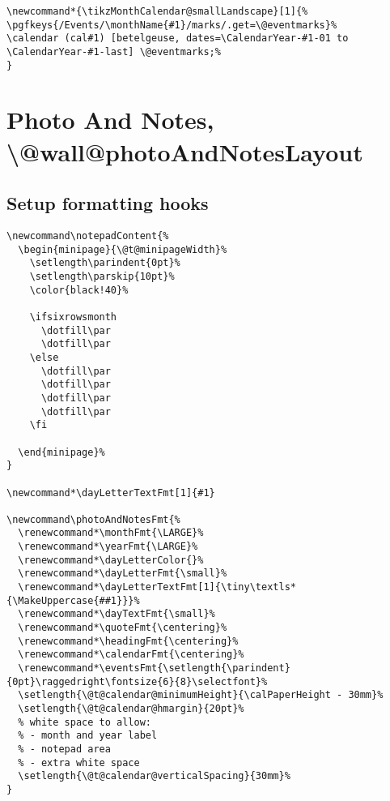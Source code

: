 \documentclass[11pt,oneside]{memoir-article}
\begin{document}
\begin{verbatim}
\newcommand*{\tikzMonthCalendar@smallLandscape}[1]{%
\pgfkeys{/Events/\monthName{#1}/marks/.get=\@eventmarks}%
\calendar (cal#1) [betelgeuse, dates=\CalendarYear-#1-01 to \CalendarYear-#1-last] \@eventmarks;%
}
\end{verbatim}

\section{Photo And Notes, \textbackslash @wall@photoAndNotesLayout}
\label{sec:org5e49ed5}
\subsection{Setup formatting hooks}
\label{sec:org3659b1f}

\begin{verbatim}
\newcommand\notepadContent{%
  \begin{minipage}{\@t@minipageWidth}%
    \setlength\parindent{0pt}%
    \setlength\parskip{10pt}%
    \color{black!40}%

    \ifsixrowsmonth
      \dotfill\par
      \dotfill\par
    \else
      \dotfill\par
      \dotfill\par
      \dotfill\par
      \dotfill\par
    \fi

  \end{minipage}%
}

\newcommand*\dayLetterTextFmt[1]{#1}

\newcommand\photoAndNotesFmt{%
  \renewcommand*\monthFmt{\LARGE}%
  \renewcommand*\yearFmt{\LARGE}%
  \renewcommand*\dayLetterColor{}%
  \renewcommand*\dayLetterFmt{\small}%
  \renewcommand*\dayLetterTextFmt[1]{\tiny\textls*{\MakeUppercase{##1}}}%
  \renewcommand*\dayTextFmt{\small}%
  \renewcommand*\quoteFmt{\centering}%
  \renewcommand*\headingFmt{\centering}%
  \renewcommand*\calendarFmt{\centering}%
  \renewcommand*\eventsFmt{\setlength{\parindent}{0pt}\raggedright\fontsize{6}{8}\selectfont}%
  \setlength{\@t@calendar@minimumHeight}{\calPaperHeight - 30mm}%
  \setlength{\@t@calendar@hmargin}{20pt}%
  % white space to allow:
  % - month and year label
  % - notepad area
  % - extra white space
  \setlength{\@t@calendar@verticalSpacing}{30mm}%
}
\end{verbatim}
\end{document}
